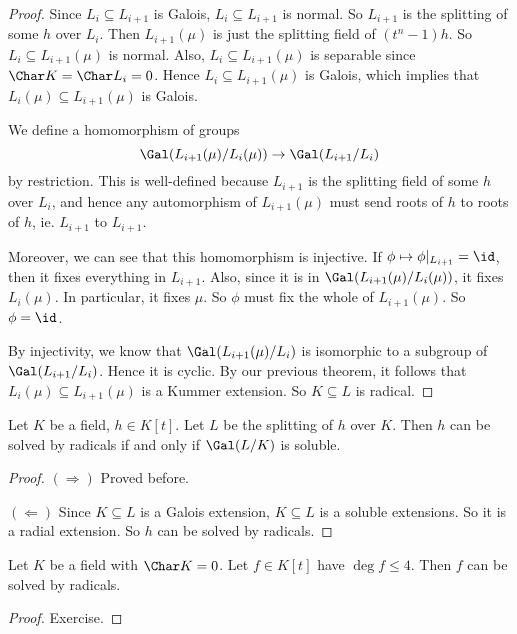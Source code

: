 \documentclass[a4paper]{article}
\begin{document}
\begin{proof}
  Since $L_i \subseteq L_{i + 1}$ is Galois, $L_i \subseteq L_{i + 1}$ is normal. So $L_{i + 1}$ is the splitting of some $h$ over $L_i$. Then $L_{i + 1}(\mu)$ is just the splitting field of $(t^n - 1) h$. So $L_i \subseteq L_{i + 1}(\mu)$ is normal. Also, $L_i \subseteq L_{i + 1}(\mu)$ is separable since $\Char K = \Char L_i = 0$. Hence $L_i \subseteq L_{i + 1}(\mu)$ is Galois, which implies that $L_i(\mu) \subseteq L_{i + 1}(\mu)$ is Galois.

  We define a homomorphism of groups
  \[
    \Gal(L_{i + 1}(\mu) / L_i (\mu)) \to \Gal(L_{i + 1}/L_i)
  \]
  by restriction. This is well-defined because $L_{i + 1}$ is the splitting field of some $h$ over $L_i$, and hence any automorphism of $L_{i + 1}(\mu)$ must send roots of $h$ to roots of $h$, ie. $L_{i + 1}$ to $L_{i + 1}$.

  Moreover, we can see that this homomorphism is injective. If $\phi \mapsto \phi|_{L_{i + 1}} = \id$, then it fixes everything in $L_{i + 1}$. Also, since it is in $\Gal(L_{i + 1}(\mu)/L_i(\mu))$, it fixes $L_i(\mu)$. In particular, it fixes $\mu$. So $\phi$ must fix the whole of $L_{i + 1}(\mu)$. So $\phi = \id$.

  By injectivity, we know that $\Gal(L_{i + 1}(\mu)/L_i)$ is isomorphic to a subgroup of $\Gal(L_{i + 1}/L_i)$. Hence it is cyclic. By our previous theorem, it follows that $L_i(\mu) \subseteq L_{i + 1}(\mu)$ is a Kummer extension. So $K\subseteq L$ is radical.
\end{proof}

\begin{cor}
  Let $K$ be a field, $h \in K[t]$. Let $L$ be the splitting of $h$ over $K$. Then $h$ can be solved by radicals if and only if $\Gal(L/K)$ is soluble.
\end{cor}

\begin{proof}
  $(\Rightarrow)$ Proved before.

  $(\Leftarrow)$ Since $K\subseteq L$ is a Galois extension, $K\subseteq L$ is a soluble extensions. So it is a radial extension. So $h$ can be solved by radicals.
\end{proof}

\begin{cor}
  Let $K$ be a field with $\Char K = 0$. Let $f \in K[t]$ have $\deg f \leq 4$. Then $f$ can be solved by radicals.
\end{cor}

\begin{proof}
  Exercise.
\end{proof}
\end{document}
